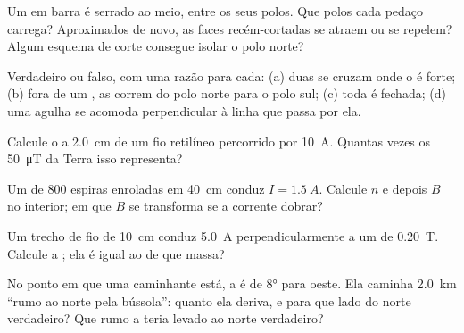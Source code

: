\begin{exercise}[$\star$]\label{exo:g11:magnetic-fields:1}
Um  em barra é serrado ao meio, entre os seus polos. Que polos cada
pedaço carrega? Aproximados de novo, as faces recém-cortadas se atraem ou
se repelem? Algum esquema de corte consegue isolar o polo norte?
\end{exercise}

\begin{exercise}[$\star$]\label{exo:g11:magnetic-fields:2}
Verdadeiro ou falso, com uma razão para cada: (a) duas  se cruzam onde o  é forte; (b) fora de um , as  correm do polo norte para o polo sul; (c) toda  é fechada; (d) uma agulha se acomoda perpendicular à linha que
passa por ela.
\end{exercise}

\begin{exercise}[$\star$]\label{exo:g11:magnetic-fields:3}
Calcule o  a \qty{2.0}{cm} de um fio retilíneo percorrido por
\qty{10}{A}. Quantas vezes os \qty{50}{\micro T} da Terra isso
representa?
\end{exercise}

\begin{exercise}[$\star$]\label{exo:g11:magnetic-fields:4}
Um  de $800$ espiras enroladas em \qty{40}{cm} conduz
$I = \qty{1.5}{A}$. Calcule $n$ e depois $B$ no interior; em que $B$ se
transforma se a corrente dobrar?
\end{exercise}

\begin{exercise}[$\star$]\label{exo:g11:magnetic-fields:5}
Um trecho de fio de \qty{10}{cm} conduz \qty{5.0}{A} perpendicularmente a
um  de \qty{0.20}{T}. Calcule a ; ela é igual ao
 de que massa?
\end{exercise}

\begin{exercise}[$\star\star$]\label{exo:g11:magnetic-fields:6}
No ponto em que uma caminhante está, a  é de $\ang{8}$ para
oeste. Ela caminha \qty{2.0}{km} ``rumo ao norte pela bússola'': quanto
ela deriva, e para que lado do norte verdadeiro? Que rumo a teria levado
ao norte verdadeiro?
\end{exercise}

